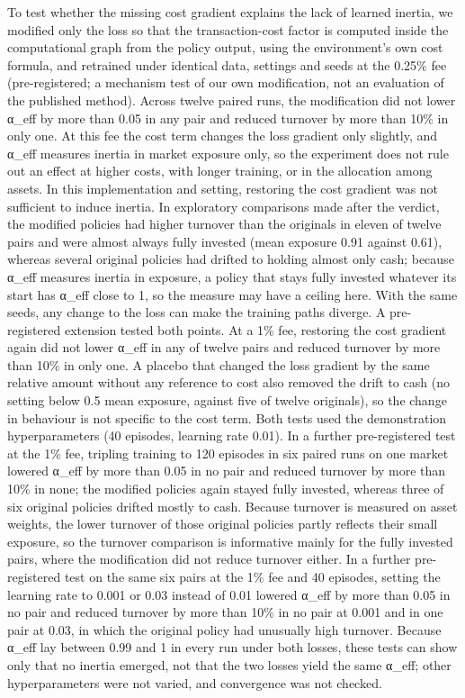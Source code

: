 \documentclass[12pt,a4paper]{report}
\newcounter{none} %
\begin{document}
To test whether the missing cost gradient explains the lack of learned
inertia, we modified only the loss so that the transaction-cost factor
is computed inside the computational graph from the policy output, using
the environment's own cost formula, and retrained under identical data,
settings and seeds at the 0.25\% fee (pre-registered; a mechanism test
of our own modification, not an evaluation of the published method).
Across twelve paired runs, the modification did not lower α\_eff by more
than 0.05 in any pair and reduced turnover by more than 10\% in only
one. At this fee the cost term changes the loss gradient only slightly,
and α\_eff measures inertia in market exposure only, so the experiment
does not rule out an effect at higher costs, with longer training, or in
the allocation among assets. In this implementation and setting,
restoring the cost gradient was not sufficient to induce inertia. In
exploratory comparisons made after the verdict, the modified policies
had higher turnover than the originals in eleven of twelve pairs and
were almost always fully invested (mean exposure 0.91 against 0.61),
whereas several original policies had drifted to holding almost only
cash; because α\_eff measures inertia in exposure, a policy that stays
fully invested whatever its start has α\_eff close to 1, so the measure
may have a ceiling here. With the same seeds, any change to the loss can
make the training paths diverge. A pre-registered extension tested both
points. At a 1\% fee, restoring the cost gradient again did not lower
α\_eff in any of twelve pairs and reduced turnover by more than 10\% in
only one. A placebo that changed the loss gradient by the same relative
amount without any reference to cost also removed the drift to cash (no
setting below 0.5 mean exposure, against five of twelve originals), so
the change in behaviour is not specific to the cost term. Both tests
used the demonstration hyperparameters (40 episodes, learning rate
0.01). In a further pre-registered test at the 1\% fee, tripling
training to 120 episodes in six paired runs on one market lowered α\_eff
by more than 0.05 in no pair and reduced turnover by more than 10\% in
none; the modified policies again stayed fully invested, whereas three
of six original policies drifted mostly to cash. Because turnover is
measured on asset weights, the lower turnover of those original policies
partly reflects their small exposure, so the turnover comparison is
informative mainly for the fully invested pairs, where the modification
did not reduce turnover either. In a further pre-registered test on the
same six pairs at the 1\% fee and 40 episodes, setting the learning rate
to 0.001 or 0.03 instead of 0.01 lowered α\_eff by more than 0.05 in no
pair and reduced turnover by more than 10\% in no pair at 0.001 and in
one pair at 0.03, in which the original policy had unusually high
turnover. Because α\_eff lay between 0.99 and 1 in every run under both
losses, these tests can show only that no inertia emerged, not that the
two losses yield the same α\_eff; other hyperparameters were not varied,
and convergence was not checked.
\end{document}

